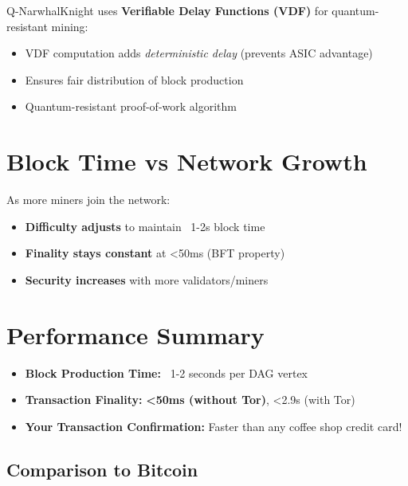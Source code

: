 \documentclass[12pt,a4paper]{article}
\begin{document}
Q-NarwhalKnight uses \textbf{Verifiable Delay Functions (VDF)} for quantum-resistant mining:
\begin{itemize}
    \item VDF computation adds \textit{deterministic delay} (prevents ASIC advantage)
    \item Ensures fair distribution of block production
    \item Quantum-resistant proof-of-work algorithm
\end{itemize}

\section{Block Time vs Network Growth}

As more miners join the network:
\begin{itemize}
    \item \textbf{Difficulty adjusts} to maintain ~1-2s block time
    \item \textbf{Finality stays constant} at <50ms (BFT property)
    \item \textbf{Security increases} with more validators/miners
\end{itemize}

\section{Performance Summary}

\begin{center}
\begin{tcolorbox}[colback=quantumgreen!10,colframe=quantumgreen!70,width=0.9\textwidth]
\begin{itemize}
    \item \textbf{Block Production Time:} ~1-2 seconds per DAG vertex
    \item \textbf{Transaction Finality:} \textcolor{quantumgreen}{\textbf{<50ms (without Tor)}}, <2.9s (with Tor)
    \item \textbf{Your Transaction Confirmation:} Faster than any coffee shop credit card!
\end{itemize}
\end{tcolorbox}
\end{center}

\subsection{Comparison to Bitcoin}
\end{document}
